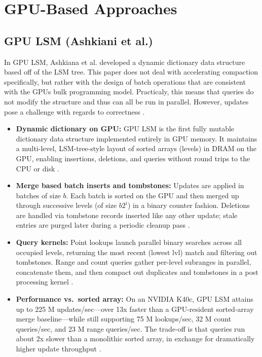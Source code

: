 \documentclass[sigconf]{acmart}
\begin{document}
       \section{GPU-Based Approaches}

        \subsection{GPU LSM (Ashkiani et al.)}
        In GPU LSM, Ashkiana et al. developed a dynamic dictionary data structure based off of the LSM tree. This paper does not deal with accelerating compaction specifically, but rather with the design of batch operations that are consistent with the GPUs bulk programming model. Practicaly, this means that queries do not modify the structure and thus can all be run in parallel. However, updates pose a challenge with regards to correctness \cite{ashkiani2018gpu}.
        
        \begin{itemize}
          \item \textbf{Dynamic dictionary on GPU:}
            GPU LSM is the first fully mutable dictionary data structure implemented entirely in GPU memory.
            It maintains a multi-level, LSM-tree-style layout of sorted arrays (levels) in DRAM on the GPU, enabling insertions, deletions, and queries without round trips to the CPU or disk \cite{ashkiani2018gpu}.
          \item \textbf{Merge based batch inserts and tombstones:}
            Updates are applied in batches of size $b$. Each batch is sorted on the GPU and then merged up through successive levels (of size $b2^i$) in a binary counter fashion.
            Deletions are handled via tombstone records inserted like any other update; stale entries are purged later during a periodic cleanup pass \cite{ashkiani2018gpu}.
          \item \textbf{Query kernels:}
            Point lookups launch parallel binary searches across all occupied levels, returning the most recent (lowest lvl) match and filtering out tombstones.
            Range and count queries gather per-level subranges in parallel, concatenate them, and then compact out duplicates and tombstones in a post processing kernel \cite{ashkiani2018gpu}.
          \item \textbf{Performance vs.\ sorted array:}
            On an NVIDIA K40c, GPU LSM attains up to 225 M updates/sec—over 13x faster than a GPU-resident sorted-array merge baseline—while still supporting 75 M lookups/sec, 32 M count queries/sec, and 23 M range queries/sec.
            The trade‐off is that queries run about 2x slower than a monolithic sorted array, in exchange for dramatically higher update throughput \cite{ashkiani2018gpu}.
        \end{itemize}
\end{document}
